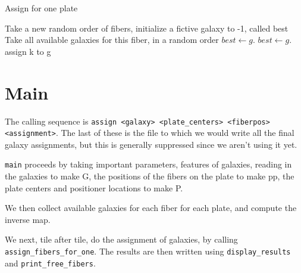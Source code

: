 \documentclass{article}
\begin{document}
\begin{algorithm}
\caption{Assign for one plate}\label{euclid}
\begin{algorithmic}[1]
\State Take a new random order of fibers, initialize a fictive galaxy to -1, called best
\State Take all available galaxies for this fiber, in a random order
\State $best \gets g$.
\EndIf
{}
\State $best \gets g$.
\EndIf
\EndIf
\EndIf
\EndFor
{}
\State assign k to g
\EndIf
\EndFor
\EndProcedure
\end{algorithmic}
\end{algorithm}


\section{Main}

 The calling sequence is {\tt assign  <galaxy> <plate\_centers> <fiberpos> <assignment>}.  The last of these is the file to which we would write all the final galaxy assignments, but this is generally suppressed since we aren't using it yet.
 
 {\tt main} proceeds by taking important parameters, features of galaxies, reading in the galaxies to make G, the positions of the fibers on the plate to make pp, the plate centers and positioner locations to make P. 
 

We then collect available galaxies for each fiber for each plate, and compute the inverse map.
 
 We next, tile after tile, do the assignment of galaxies, by calling {\tt assign\_fibers\_for\_one}. The results are then written using {\tt display\_results} and {\tt print\_free\_fibers}.
 
 \begin{verbatim}

\end{verbatim}
 
\end{document}
